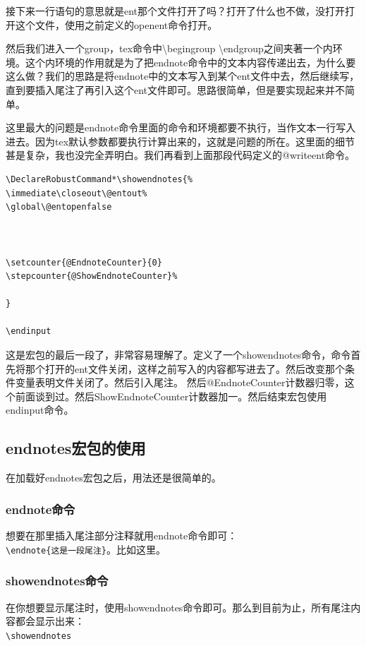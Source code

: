 \documentclass[12pt,oneside]{book}
\begin{document}
\begin{common-format}
接下来一行语句的意思就是ent那个文件打开了吗？打开了什么也不做，没打开打开这个文件，使用之前定义的openent命令打开。

然后我们进入一个group，tex命令中\textbackslash begingroup \textbackslash endgroup之间夹著一个内环境。这个内环境的作用就是为了把endnote命令中的文本内容传递出去，为什么要这么做？我们的思路是将endnote中的文本写入到某个ent文件中去，然后继续写，直到要插入尾注了再引入这个ent文件即可。思路很简单，但是要实现起来并不简单。

这里最大的问题是endnote命令里面的命令和环境都要不执行，当作文本一行写入进去。因为tex默认参数都要执行计算出来的，这就是问题的所在。这里面的细节甚是复杂，我也没完全弄明白。我们再看到上面那段代码定义的@writeent命令。


\begin{Verbatim}
\DeclareRobustCommand*\showendnotes{%
\immediate\closeout\@entout%
\global\@entopenfalse



\setcounter{@EndnoteCounter}{0}
\stepcounter{@ShowEndnoteCounter}%

}

\endinput
\end{Verbatim}
这是宏包的最后一段了，非常容易理解了。定义了一个showendnotes命令，命令首先将那个打开的ent文件关闭，这样之前写入的内容都写进去了。然后改变那个条件变量表明文件关闭了。然后引入尾注。
然后@EndnoteCounter计数器归零，这个前面谈到过。然后ShowEndnoteCounter计数器加一。然后结束宏包使用endinput命令。


\subsection{endnotes宏包的使用}
在加载好endnotes宏包之后，用法还是很简单的。

\subsubsection{endnote命令}
想要在那里插入尾注部分注释就用endnote命令即可：\\
\verb+\endnote{这是一段尾注}+。比如这里。

\subsubsection{showendnotes命令}
在你想要显示尾注时，使用showendnotes命令即可。那么到目前为止，所有尾注内容都会显示出来：\\
\verb+\showendnotes+


\end{common-format}
\end{document}
